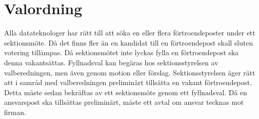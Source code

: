 \documentclass[a4paper]{dteklag}
\begin{document}
\section{Valordning}
\para [Inval] Alla datateknologer har rätt till att söka en eller flera förtroendeposter under ett sektionsmöte.
\para Då det finns fler än en kandidat till en förtroendepost skall sluten votering tillämpas.
\para[Vakantsättning] Då sektionsmötet inte lyckas fylla en förtroendepost ska denna vakantsättas.
\para[Fyllnadsval] Fyllnadsval kan begäras hos sektionsstyrelsen av valberedningen, men även genom motion eller förslag.
\para Sektionsstyrelsen äger rätt att i samråd med valberedningen preliminärt tillsätta en vakant förtroendepost.
\stycke Detta måste sedan bekräftas av ett sektionsmöte genom ett fyllnadsval.
\para Då en ansvarspost ska tillsättas preliminärt, måste ett avtal om ansvar tecknas mot firman.

\end{document}
